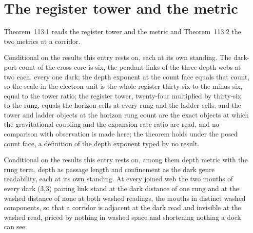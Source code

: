 \section{The register tower and the metric}\label{mod:X-5-register-tower-and-the-metric}
\label{narr:open:10-5}Theorem~113.1 reads the register tower and the metric and Theorem~113.2 the two metrics at a corridor.
\begin{chconditional}\label{box:X-5-register-tower-and-the-metric:1}
Conditional on the results this entry rests on, each at its own standing. The dark-port count of the cross core is six, the pendant links of the three depth webs at two each, every one dark; the depth exponent at the count face equals that count, so the scale in the electron unit is the whole register thirty-six to the minus six, equal to the tower ratio; the register tower, twenty-four multiplied by thirty-six to the rung, equals the horizon cells at every rung and the ladder cells, and the tower and ladder objects at the horizon rung count are the exact objects at which the gravitational coupling and the expansion-rate ratio are read, and no comparison with observation is made here; the theorem holds under the posed count face, a definition of the depth exponent typed by no result.
\end{chconditional}
\begin{chconditional}\label{box:X-5-register-tower-and-the-metric:2}
Conditional on the results this entry rests on, among them depth metric with the rung term, depth as passage length and confinement as the dark genre readability, each at its own standing. At every joined web the two mouths of every dark (3,3) pairing link stand at the dark distance of one rung and at the washed distance of none at both washed readings, the mouths in distinct washed components, so that a corridor is adjacent at the dark read and invisible at the washed read, priced by nothing in washed space and shortening nothing a dock can see.
\end{chconditional}
